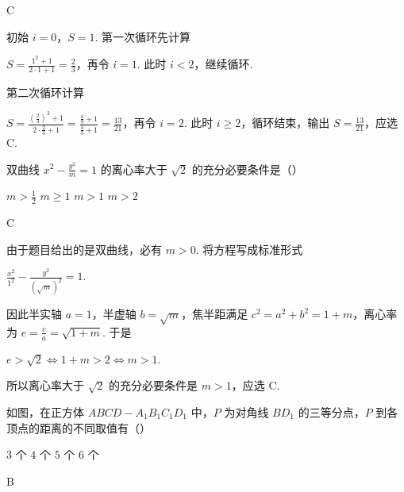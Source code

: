 \begin{answer}
C
\end{answer}

\begin{solution}
初始 \(i=0\)，\(S=1\). 第一次循环先计算

\(S=\frac{1^2+1}{2\cdot1+1}=\frac{2}{3}\)，再令 \(i=1\). 此时 \(i<2\)，继续循环.

第二次循环计算

\(S=\frac{(\frac{2}{3})^2+1}{2\cdot\frac{2}{3}+1}=\frac{\frac{4}{9}+1}{\frac{4}{3}+1}=\frac{13}{21}\)，再令 \(i=2\). 此时 \(i\geqslant2\)，循环结束，输出 \(S=\frac{13}{21}\)，应选 C.
\end{solution}

\begin{problem}
双曲线 \(x^{2} - \frac{y^{2}}{m} = 1\) 的离心率大于 \(\sqrt{2}\) 的充分必要条件是（\quad）

\choices
    {\(m > \frac{1}{2}\)}
    {\(m \geqslant 1\)}
    {\(m > 1\)}
    {\(m > 2\)}
\end{problem}

\begin{answer}
C
\end{answer}

\begin{solution}
由于题目给出的是双曲线，必有 \(m>0\). 将方程写成标准形式

\(\frac{x^2}{1^2}-\frac{y^2}{(\sqrt{m})^2}=1\).

因此半实轴 \(a=1\)，半虚轴 \(b=\sqrt{m}\)，焦半距满足 \(c^2=a^2+b^2=1+m\)，离心率为 \(e=\frac{c}{a}=\sqrt{1+m}\). 于是

\(e>\sqrt{2}\iff 1+m>2\iff m>1\).

所以离心率大于 \(\sqrt{2}\) 的充分必要条件是 \(m>1\)，应选 C.
\end{solution}

\begin{problem}
如图，在正方体 \(ABCD - A_{1}B_{1}C_{1}D_{1}\) 中，\(P\) 为对角线 \(BD_{1}\) 的三等分点，\(P\) 到各顶点的距离的不同取值有（\quad）


\choices
    {\(3\) 个}
    {\(4\) 个}
    {\(5\) 个}
    {\(6\) 个}
\end{problem}

\begin{answer}
B
\end{answer}

